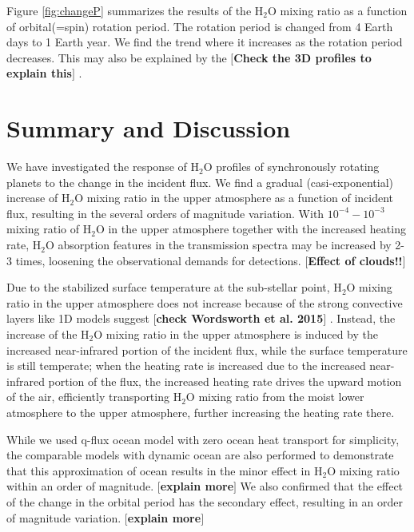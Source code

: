 \documentclass[11pt,numberedappendix,twocolappendix,]{emulateapj}
\def\water{H$_2$O }
\def\memo#1{\color{red}$[${\bf #1}$]$ \color{black}}
\begin{document}
Figure \ref{fig:changeP} summarizes the results of the \water mixing ratio as a function of orbital(=spin) rotation period. 
The rotation period is changed from 4 Earth days to 1 Earth year. 
We find the trend where it increases as the rotation period decreases. 
This may also be explained by the \memo{Check the 3D profiles to explain this}. 


\section{Summary and Discussion}
\label{s:summary}

We have investigated the response of \water profiles of synchronously rotating planets to the change in the incident flux. 
We find a gradual (casi-exponential) increase of \water mixing ratio in the upper atmosphere as a function of incident flux, resulting in the several orders of magnitude variation. 
With $10^{-4}-10^{-3}$ mixing ratio of \water in the upper atmosphere together with the increased heating rate, \water absorption features in the transmission spectra may be increased by 2-3 times, loosening the observational demands for detections. 
\memo{Effect of clouds!!}

Due to the stabilized surface temperature at the sub-stellar point, \water mixing ratio in the upper atmosphere does not increase because of the strong convective layers like 1D models suggest \memo{check Wordsworth et al. 2015}. 
Instead, the increase of the \water mixing ratio in the upper atmosphere is induced by the increased near-infrared portion of the incident flux, while the surface temperature is still temperate; when the heating rate is increased due to the increased near-infrared portion of the flux, the increased heating rate drives the upward motion of the air, efficiently transporting \water mixing ratio from the moist lower atmosphere to the upper atmosphere, further increasing the heating rate there. 

While we used q-flux ocean model with zero ocean heat transport for simplicity, the comparable models with dynamic ocean are also performed to demonstrate that this approximation of ocean results in the minor effect in \water mixing ratio within an order of magnitude. 
\memo{explain more}
We also confirmed that the effect of the change in the orbital period has the secondary effect, resulting in an order of magnitude variation. 
\memo{explain more}
\end{document}
